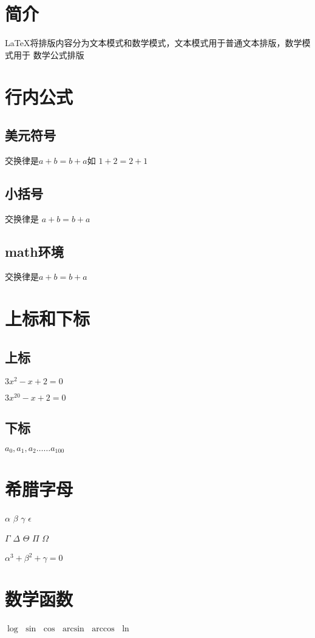 \documentclass{ctexart}
\begin{document}
    \tableofcontents
    \section{简介}
    \LaTeX{}将排版内容分为文本模式和数学模式，文本模式用于普通文本排版，数学模式用于
    数学公式排版
    \section{行内公式}
    \subsection{美元符号}
    交换律是$ a+b=b+a $如 $ 1+2 = 2+1 $
    \subsection{小括号}
    交换律是 \(a+b=b+a\)
    \subsection{math环境}
    交换律是\begin{math}
        a+b=b+a
    \end{math}
    \section{上标和下标}
    \subsection{上标}
    $ 3x^2 - x +2 =0 $ 
    
    $ 3x^{20} - x +2 =0 $
    \subsection{下标}
    $ a_0,a_1,a_2 …… a_{100} $

    \section{希腊字母}
    $ \alpha$
    $\beta$
    $\gamma$
    $\epsilon$

    $\Gamma$
    $\Delta$
    $\Theta$
    $\Pi$
    $\Omega$

    $\alpha^3 + \beta^2 + \gamma =0 $
    \section{数学函数}
    $\log$
    $\sin$
    $\cos$
    $\arcsin$
    $\arccos$
    $\ln$
\end{document}
